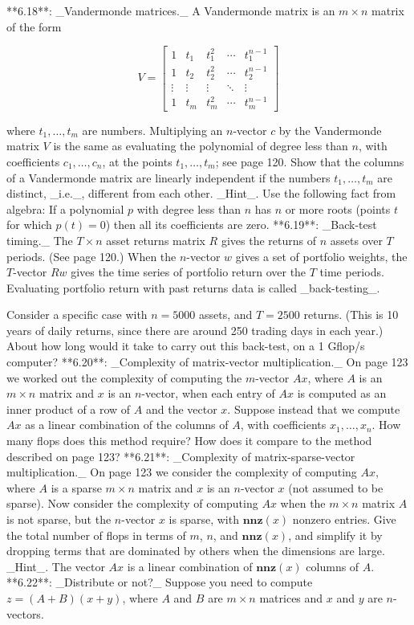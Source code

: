

**6.18**: _Vandermonde matrices._ A Vandermonde matrix is an \(m\times n\) matrix of the form

\[V=\left[\begin{array}{ccccc}1&t_{1}&t_{1}^{2}&\cdots&t_{1}^{n-1}\\ 1&t_{2}&t_{2}^{2}&\cdots&t_{2}^{n-1}\\ \vdots&\vdots&\vdots&\ddots&\vdots\\ 1&t_{m}&t_{m}^{2}&\cdots&t_{m}^{n-1}\end{array}\right]\]

where \(t_{1},\ldots,t_{m}\) are numbers. Multiplying an \(n\)-vector \(c\) by the Vandermonde matrix \(V\) is the same as evaluating the polynomial of degree less than \(n\), with coefficients \(c_{1},\ldots,c_{n}\), at the points \(t_{1},\ldots,t_{m}\); see page 120. Show that the columns of a Vandermonde matrix are linearly independent if the numbers \(t_{1},\ldots,t_{m}\) are distinct, _i.e._, different from each other. _Hint_. Use the following fact from algebra: If a polynomial \(p\) with degree less than \(n\) has \(n\) or more roots (points \(t\) for which \(p(t)=0\)) then all its coefficients are zero.
**6.19**: _Back-test timing._ The \(T\times n\) asset returns matrix \(R\) gives the returns of \(n\) assets over \(T\) periods. (See page 120.) When the \(n\)-vector \(w\) gives a set of portfolio weights, the \(T\)-vector \(Rw\) gives the time series of portfolio return over the \(T\) time periods. Evaluating portfolio return with past returns data is called _back-testing_.

Consider a specific case with \(n=5000\) assets, and \(T=2500\) returns. (This is 10 years of daily returns, since there are around 250 trading days in each year.) About how long would it take to carry out this back-test, on a 1 Gflop/s computer?
**6.20**: _Complexity of matrix-vector multiplication._ On page 123 we worked out the complexity of computing the \(m\)-vector \(Ax\), where \(A\) is an \(m\times n\) matrix and \(x\) is an \(n\)-vector, when each entry of \(Ax\) is computed as an inner product of a row of \(A\) and the vector \(x\). Suppose instead that we compute \(Ax\) as a linear combination of the columns of \(A\), with coefficients \(x_{1},\ldots,x_{n}\). How many flops does this method require? How does it compare to the method described on page 123?
**6.21**: _Complexity of matrix-sparse-vector multiplication._ On page 123 we consider the complexity of computing \(Ax\), where \(A\) is a sparse \(m\times n\) matrix and \(x\) is an \(n\)-vector \(x\) (not assumed to be sparse). Now consider the complexity of computing \(Ax\) when the \(m\times n\) matrix \(A\) is not sparse, but the \(n\)-vector \(x\) is sparse, with \(\mathbf{nnz}(x)\) nonzero entries. Give the total number of flops in terms of \(m\), \(n\), and \(\mathbf{nnz}(x)\), and simplify it by dropping terms that are dominated by others when the dimensions are large. _Hint_. The vector \(Ax\) is a linear combination of \(\mathbf{nnz}(x)\) columns of \(A\).
**6.22**: _Distribute or not?_ Suppose you need to compute \(z=(A+B)(x+y)\), where \(A\) and \(B\) are \(m\times n\) matrices and \(x\) and \(y\) are \(n\)-vectors.

